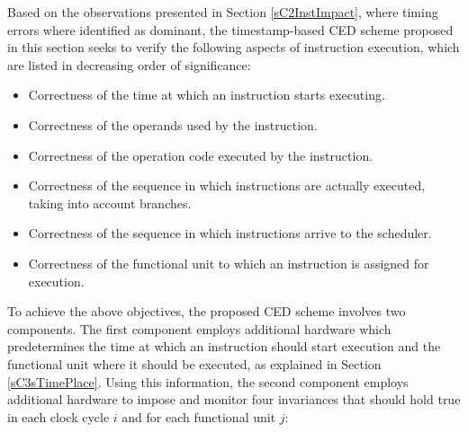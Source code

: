 \documentclass[12pt]{yalephd}
\begin{document}
Based on the observations presented in Section \ref{sC2InstImpact}, where timing errors where identified as dominant, the timestamp-based CED scheme proposed in this section seeks to verify the following aspects of instruction execution, which are listed in decreasing order of significance:

\begin{itemize}
\item Correctness of the time at which an instruction starts executing.
\item Correctness of the operands used by the instruction.
\item Correctness of the operation code executed by the instruction.
\item Correctness of the sequence in which instructions are actually executed, taking into account branches.
\item Correctness of the sequence in which instructions arrive to the scheduler.
\item Correctness of the functional unit to which an instruction is assigned for execution.
\end{itemize}

To achieve the above objectives, the proposed CED scheme involves two components. The first component employs additional hardware which predetermines the time at which an instruction should start execution and the functional unit where it should be executed, as explained in Section \ref{sC3sTimePlace}. Using this information, the second component employs additional hardware to impose and monitor four invariances that should hold true in each clock cycle $i$ and for each functional unit $j$:
\end{document}
